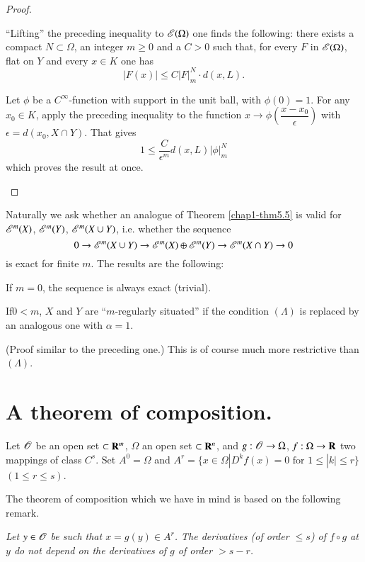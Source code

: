 \begin{proof}
\begin{itemize}
``Lifting'' the preceding inequality to $\mathscr{E}(\Omega)$ one finds the following: there exists a compact $N\subset \Omega$, an integer $m\geq 0$ and a $C>0$ such that, for every $F$ in $\mathscr{E}(\Omega)$, flat on $Y$ and every $x\in K$ one has
$$
|F(x)|\leq C|F|^{N}_{m}\cdot d(x,L).
$$

Let $\phi$ be a $C^{\infty}$-function with support in the unit ball, with $\phi(0)=1$. For any $x_{0}\in K$, apply the preceding inequality to the function $x\to \phi \left(\dfrac{x-x_{0}}{\epsilon}\right)$ with $\epsilon=d(x_{0},X\cap Y)$. That gives
$$
1\leq \dfrac{C}{\epsilon^{m}}d(x,L)|\phi|^{N}_{m}
$$
which proves the result at once.
\end{itemize}
\end{proof}

\begin{remark}\label{chap1-rem5.6}
Naturally we ask whether an analogue of Theorem \ref{chap1-thm5.5} is valid for $\mathscr{E}^{m}(X)$, $\mathscr{E}^{m}(Y)$, $\mathscr{E}^{m}(X\cup Y)$, i.e. whether the sequence
$$
0\to \mathscr{E}^{m}(X\cup Y)\to \mathscr{E}^{m}(X)\oplus \mathscr{E}^{m}(Y)\to \mathscr{E}^{m}(X\cap Y)\to 0
$$
is exact for finite $m$. The results are the following:

If $m=0$, the sequence is always exact (trivial).

If\pageoriginale $0<m$, $X$ and $Y$ are ``$m$-regularly situated'' if the condition $(\Lambda)$ is replaced by an analogous one with $\alpha=1$.
\end{remark}

(Proof similar to the preceding one.) This is of course much more restrictive than $(\Lambda)$.

\section[A theorem of composition]{A theorem of composition\protect\footnotemark[1].}

Let $\mathscr{O}$ be an open set $\subset \mathbf{R}^{m}$, $\Omega$ an open set $\subset \mathbf{R}^{n}$, and $g:\mathscr{O}\to \Omega$, $f:\Omega\to \mathbf{R}$ two mappings of class $C^{s}$. Set $A^{0}=\Omega$ and $A^{r}=\{x\in \Omega|D^{k}f(x)=0 \text{ for } 1\leq |k|\leq r\}$ $(1\leq r\leq s)$.

The theorem of composition which we have in mind is based on the following remark.

{\em Let $y\in \mathscr{O}$ be such that $x=g(y)\in A^{r}$. The derivatives (of order $\leq s$) of $f\circ g$ at $y$ do not depend on the derivatives of $g$ of order $>s-r$.}

